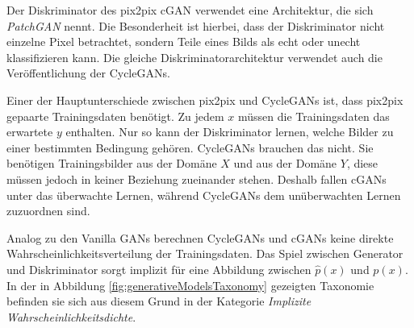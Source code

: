Der Diskriminator des pix2pix \ac{cGAN} verwendet eine Architektur, die sich \emph{PatchGAN} nennt. Die Besonderheit ist hierbei, dass der Diskriminator nicht einzelne Pixel betrachtet, sondern Teile eines Bilds als echt oder unecht klassifizieren kann. Die gleiche Diskriminatorarchitektur verwendet auch die Veröffentlichung der \acp{CycleGAN}. \cite{pix2pix} \cite{cycleGAN}

Einer der Hauptunterschiede zwischen pix2pix und \acp{CycleGAN} ist, dass pix2pix gepaarte Trainingsdaten benötigt. Zu jedem $x$ müssen die Trainingsdaten das erwartete $y$ enthalten. Nur so kann der Diskriminator lernen, welche Bilder zu einer bestimmten Bedingung gehören. \acp{CycleGAN} brauchen das nicht. Sie benötigen Trainingsbilder aus der Domäne $X$ und aus der Domäne $Y$, diese müssen jedoch in keiner Beziehung zueinander stehen. Deshalb fallen \acp{cGAN} unter das überwachte Lernen, während \acp{CycleGAN} dem unüberwachten Lernen zuzuordnen sind. \cite{pix2pix} \cite{cycleGAN}

Analog zu den Vanilla \acp{GAN} berechnen \acp{CycleGAN} und \acp{cGAN} keine direkte Wahrscheinlichkeitsverteilung der Trainingsdaten. Das Spiel zwischen Generator und Diskriminator sorgt implizit für eine Abbildung zwischen $\hat{p}(x)$ und $p(x)$. In der in Abbildung \ref{fig:generativeModelsTaxonomy} gezeigten Taxonomie befinden sie sich aus diesem Grund in der Kategorie \emph{Implizite Wahrscheinlichkeitsdichte}. \cite{pix2pix} \cite{cycleGAN}



